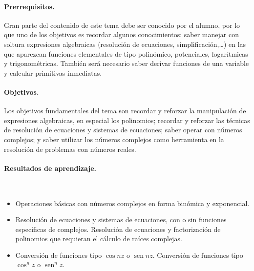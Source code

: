 \paragraph{Prerrequisitos.}
Gran parte del contenido de este tema debe ser conocido por el alumno, por lo que uno de los objetivos es recordar algunos conocimientos: saber manejar con soltura expresiones algebraicas (resolución de ecuaciones, simplificación,\dots) en las que aparezcan funciones elementales de tipo polinómico, potenciales, logarítmicas y trigonométricas.
También será necesario saber derivar funciones de una variable y calcular primitivas inmediatas.


\paragraph{Objetivos.}
Los objetivos fundamentales del tema son recordar y reforzar la manipulación de expresiones algebraicas, en especial los polinomios; recordar y reforzar las técnicas de resolución de ecuaciones y sistemas de ecuaciones; saber operar con números complejos; y saber utilizar los números complejos como herramienta en la resolución de problemas con números reales.

\paragraph{Resultados de aprendizaje.}\ 

\vspace{-.5em}
\begin{itemize}
\item
Operaciones básicas con números complejos en forma binómica y exponencial.
\item
Resolución de ecuaciones y sistemas de ecuaciones, con o sin funciones específicas de complejos.
Resolución de ecuaciones y factorización de polinomios que requieran el cálculo de raíces complejas.
\item
Conversión de funciones tipo $\cos nz$ o $\operatorname{sen} nz$.
Conversión de funciones tipo $\cos^n z$ o $\operatorname{sen}^n z$.


%
%


\end{itemize}

